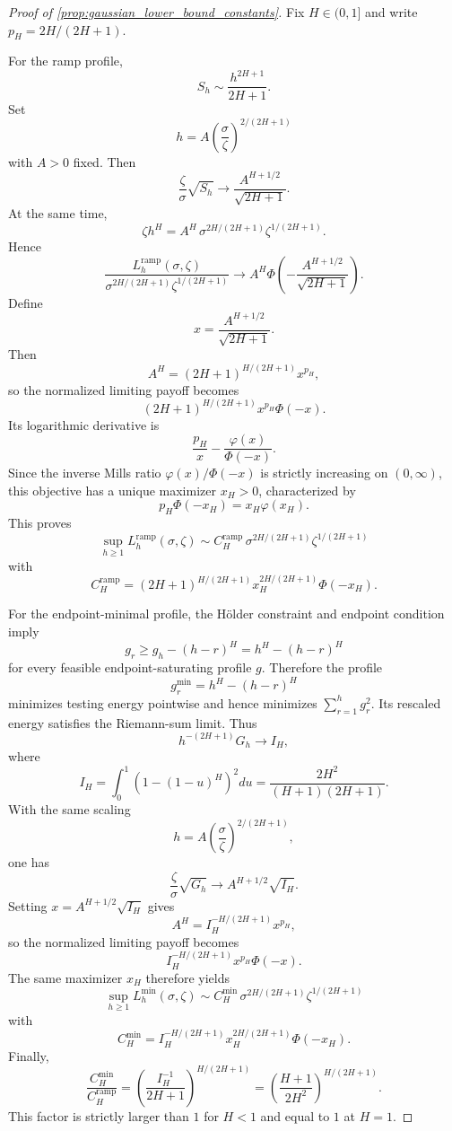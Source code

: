 \begin{proof}[Proof of \cref{prop:gaussian_lower_bound_constants}]
Fix $H\in(0,1]$ and write $p_H=2H/(2H+1)$.

For the ramp profile,
\[
  S_h\sim \frac{h^{2H+1}}{2H+1}.
\]
Set
\[
  h=A\left(\frac{\sigma}{\zeta}\right)^{2/(2H+1)}
\]
with $A>0$ fixed. Then
\[
  \frac{\zeta}{\sigma}\sqrt{S_h}
  \to
  \frac{A^{H+1/2}}{\sqrt{2H+1}}.
\]
At the same time,
\[
  \zeta h^H
  =
  A^H\,\sigma^{2H/(2H+1)}\zeta^{1/(2H+1)}.
\]
Hence
\[
  \frac{L_h^{\mathrm{ramp}}(\sigma,\zeta)}{\sigma^{2H/(2H+1)}\zeta^{1/(2H+1)}}
  \to
  A^H\Phi\!\left(-\frac{A^{H+1/2}}{\sqrt{2H+1}}\right).
\]
Define
\[
  x=\frac{A^{H+1/2}}{\sqrt{2H+1}}.
\]
Then
\[
  A^H=(2H+1)^{H/(2H+1)}x^{p_H},
\]
so the normalized limiting payoff becomes
\[
  (2H+1)^{H/(2H+1)}x^{p_H}\Phi(-x).
\]
Its logarithmic derivative is
\[
  \frac{p_H}{x}-\frac{\varphi(x)}{\Phi(-x)}.
\]
Since the inverse Mills ratio $\varphi(x)/\Phi(-x)$ is strictly increasing on
$(0,\infty)$, this objective has a unique maximizer $x_H>0$, characterized by
\[
  p_H\Phi(-x_H)=x_H\varphi(x_H).
\]
This proves
\[
  \sup_{h\ge 1}L_h^{\mathrm{ramp}}(\sigma,\zeta)
  \sim
  C_H^{\mathrm{ramp}}\,\sigma^{2H/(2H+1)}\zeta^{1/(2H+1)}
\]
with
\[
  C_H^{\mathrm{ramp}}
  =
  (2H+1)^{H/(2H+1)}x_H^{2H/(2H+1)}\Phi(-x_H).
\]

For the endpoint-minimal profile, the H\"older constraint and endpoint condition
imply
\[
  g_r\ge g_h-(h-r)^H=h^H-(h-r)^H
\]
for every feasible endpoint-saturating profile $g$. Therefore the profile
\[
  g_r^{\min}=h^H-(h-r)^H
\]
minimizes testing energy pointwise and hence minimizes
$\sum_{r=1}^h g_r^2$. Its rescaled energy satisfies the Riemann-sum limit. Thus
\[
  h^{-(2H+1)}G_h \to I_H,
\]
where
\[
  I_H = \int_0^1 \left(1-(1-u)^H\right)^2du
  = \frac{2H^2}{(H+1)(2H+1)}.
\]
With the same scaling
\[
  h=A\left(\frac{\sigma}{\zeta}\right)^{2/(2H+1)},
\]
one has
\[
  \frac{\zeta}{\sigma}\sqrt{G_h}
  \to A^{H+1/2}\sqrt{I_H}.
\]
Setting $x=A^{H+1/2}\sqrt{I_H}$ gives
\[
  A^H=I_H^{-H/(2H+1)}x^{p_H},
\]
so the normalized limiting payoff becomes
\[
  I_H^{-H/(2H+1)}x^{p_H}\Phi(-x).
\]
The same maximizer $x_H$ therefore yields
\[
  \sup_{h\ge 1}L_h^{\min}(\sigma,\zeta)
  \sim
  C_H^{\min}\,\sigma^{2H/(2H+1)}\zeta^{1/(2H+1)}
\]
with
\[
  C_H^{\min}
  =
  I_H^{-H/(2H+1)}x_H^{2H/(2H+1)}\Phi(-x_H).
\]
Finally,
\[
  \frac{C_H^{\min}}{C_H^{\mathrm{ramp}}}
  =
  \left(\frac{I_H^{-1}}{2H+1}\right)^{H/(2H+1)}
  =
  \left(\frac{H+1}{2H^2}\right)^{H/(2H+1)}.
\]
This factor is strictly larger than $1$ for $H<1$ and equal to $1$ at $H=1$.
\end{proof}

